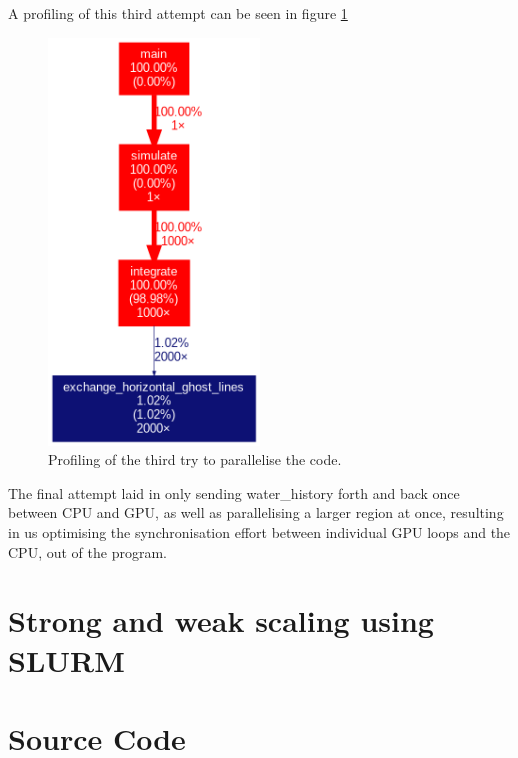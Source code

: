 \documentclass{article}
\begin{document}
A profiling of this third attempt can be seen in figure \ref{fig:profiling:thirdattempt}
\begin{figure}[h]
    \includegraphics[width=0.5\textwidth]{./figures/sequential_profile.png}
    \centering
    \caption{Profiling of the third try to parallelise the code. }
    \label{fig:profiling:thirdattempt}
\end{figure}

The final attempt laid in only sending water\_history forth and back once between CPU and GPU, as well as parallelising a larger region at once, resulting in us optimising the synchronisation effort between individual GPU loops and the CPU, out of the program. 

\section{Strong and weak scaling using SLURM}



\FloatBarrier
\section{Source Code}
\label{sec:source}

\end{document}
